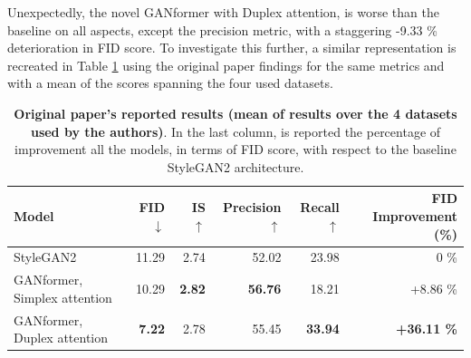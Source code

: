 \documentclass{article}
\begin{document}
Unexpectedly, the novel GANformer with Duplex attention, is worse than the baseline on all aspects, except the precision metric, with a staggering -9.33 \% deterioration in FID score.
To investigate this further, a similar representation is recreated in Table \ref{tab:orig-results} using 
the original paper findings for the same metrics and with a mean of the scores spanning the four 
used datasets.
\begin{table}[htb]
	\centering
	\caption{\textbf{Original paper's reported results (mean of results over the 4 datasets used by the 
	authors)}. In the last column, is reported the percentage of improvement all the models, in terms 
	of FID score, with respect to the baseline StyleGAN2 architecture.}
	\label{tab:orig-results}
	\vspace{3mm}
	\small
	\begin{tabular}{l|rrrrr}
		\toprule
		\textbf{Model}  & \textbf{FID $\downarrow$}  & \textbf{IS $\uparrow$} & 
		\textbf{Precision$\uparrow$}  & \textbf{Recall $\uparrow$} & \textbf{FID Improvement (\%)}\\ 
		\midrule
		StyleGAN2                    & 11.29 & 2.74 & 52.02      & 23.98 & 0 \% \\ 
		{GANformer, Simplex attention} & 10.29 & \textbf{2.82}   & \textbf{56.76}     & 18.21  & 
		+8.86 \% \\ 
		{GANformer, Duplex attention}  & \textbf{7.22}   & 2.78 & 55.45     & \textbf{33.94} & 
		\textbf{+36.11 \%} 
		\\ 
		\bottomrule
	\end{tabular}
\end{table}
\end{document}
